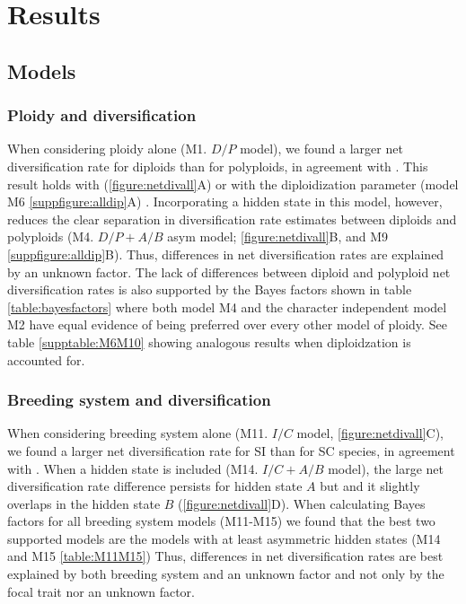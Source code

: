 \section{Results}

\subsection{Models}
\subsubsection{Ploidy and diversification}
When considering ploidy alone (M1. $D/P$ model), we found a larger net diversification rate for diploids than for polyploids, in agreement with \citet{mayrose_2011, mayrose_2015}.
This result holds with (\cref{figure:netdivall}A) or with the diploidization parameter (model M6 \cref{suppfigure:alldip}A) .
Incorporating a hidden state in this model, however, reduces the clear separation in diversification rate estimates between diploids and polyploids (M4. $D/P+A/B$ asym model; \cref{figure:netdivall}B, and M9 \cref{suppfigure:alldip}B).
Thus, differences in net diversification rates are explained by an unknown factor.
The lack of differences between diploid and polyploid net diversification rates is also supported by the Bayes factors shown in table \cref{table:bayesfactors} where both model M4 and the character independent model M2 have equal evidence of  being preferred over every other model of ploidy. See table \cref{supptable:M6M10} showing analogous results when diploidzation is accounted for.

\subsubsection{Breeding system and diversification}
When considering breeding system alone (M11. $I/C$ model, \cref{figure:netdivall}C), we found a larger net diversification rate for SI than for SC species, in agreement with \citet{goldberg_2010}.
When a hidden state is included (M14. $I/C+A/B$ model), the large net diversification rate difference persists for hidden state $A$ but and it slightly overlaps in the  hidden state $B$ (\cref{figure:netdivall}D).
When calculating Bayes factors for all breeding system models (M11-M15) we found that the best two supported models are the models with at least asymmetric hidden states (M14 and M15 \cref{table:M11M15})
Thus, differences in net diversification rates are best explained by both breeding system and an unknown factor \citep[as in Onagraceae;][]{freyman_2019} and not only by the focal trait nor an unknown factor.

